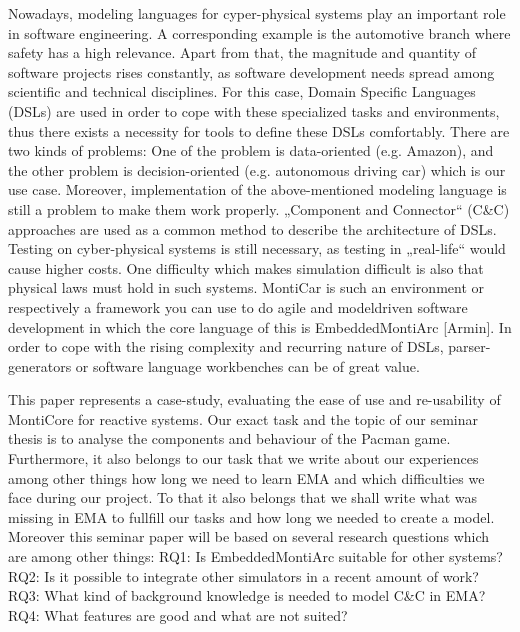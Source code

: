 Nowadays, modeling languages for cyper-physical systems play an important role in software
engineering. A corresponding example is the automotive branch where safety has a high relevance.
Apart from that, the magnitude and quantity of software projects rises constantly, as software
development needs spread among scientific and technical disciplines. For this case, Domain Specific
Languages (DSLs) are used in order to cope with these specialized tasks and environments, thus there
exists a necessity for tools to define these DSLs comfortably. There are two kinds of problems: One of
the problem is data-oriented (e.g. Amazon), and the other problem is decision-oriented (e.g.
autonomous driving car) which is our use case. Moreover, implementation of the above-mentioned
modeling language is still a problem to make them work properly. „Component and Connector“
(C\&C) approaches are used as a common method to describe the architecture of DSLs. Testing on
cyber-physical systems is still necessary, as testing in „real-life“ would cause higher costs. One
difficulty which makes simulation difficult is also that physical laws must hold in such systems.
MontiCar is such an environment or respectively a framework you can use to do agile and modeldriven software development in which the core language of this is EmbeddedMontiArc [Armin]. In
order to cope with the rising complexity and recurring nature of DSLs, parser-generators or software
language workbenches can be of great value.

This paper represents a case-study, evaluating the ease of use and re-usability of MontiCore for
reactive systems. Our exact task and the topic of our seminar thesis is to analyse the components
and behaviour of the Pacman game. Furthermore, it also belongs to our task that we write about our
experiences among other things how long we need to learn EMA and which difficulties we face
during our project. To that it also belongs that we shall write what was missing in EMA to fullfill our
tasks and how long we needed to create a model. Moreover this seminar paper will be based on
several research questions which are among other things:
RQ1: Is EmbeddedMontiArc suitable for other systems?
RQ2: Is it possible to integrate other simulators in a recent amount of work?
RQ3: What kind of background knowledge is needed to model C\&C in EMA?
RQ4: What features are good and what are not suited?